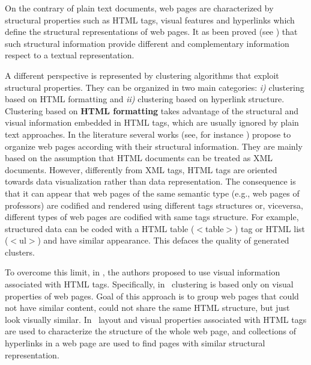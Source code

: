 On the contrary of plain text documents, web pages are characterized by structural properties such as HTML tags, visual features and hyperlinks which define the structural representations of web pages. It as been proved (see \cite{Zhu:2007, Crescenzi:2005, Bohunsky:2010, Lin:2010}) that such structural information provide different and complementary information respect to a textual representation.

A different perspective is represented by clustering algorithms that exploit structural properties. They can be organized in two main categories: \emph{i)} clustering based on HTML formatting and \emph{ii)} clustering based on hyperlink structure.   
Clustering based on \textbf{HTML formatting} takes advantage of the structural and visual information embedded in HTML tags, which are usually ignored by plain text approaches. 
In the literature several works (see, for instance \cite{Buttler:2004,Helmer:2012}) propose to organize web pages according with their structural information. They are mainly based on the assumption that HTML documents can be treated as XML documents. 
However, differently from XML tags, HTML tags are oriented towards data visualization rather than data representation. The consequence is that  it can appear that web pages of the same semantic type (e.g., web pages of professors) are codified and rendered using different tags structures or, viceversa, different types of web pages are codified with same tags structure. For example, structured data can be coded with a HTML table ($<$table$>$) tag or HTML list ($<$ul$>$) and have similar appearance. This defaces the quality of generated clusters.

To overcome this limit, in \cite{Bohunsky:2010, Crescenzi:2005}, the authors proposed to use visual information associated with HTML tags. %
Specifically, in~\cite{Bohunsky:2010} clustering is based only on visual properties of web pages. Goal of this approach is to group web pages that could not have similar content, could not share the same HTML structure, but just look visually similar. 
In~\cite{Crescenzi:2005}  %
layout and visual properties associated with HTML tags are used to characterize the structure of the whole web page, and collections of hyperlinks in a web page are used to find pages with similar structural representation. 

